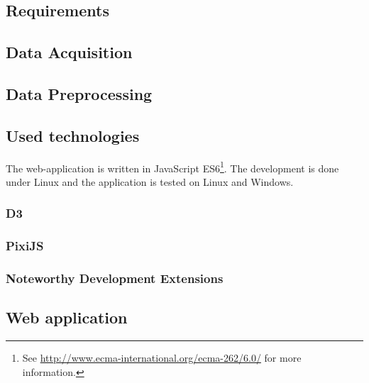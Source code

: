 \subsection{Requirements}


\subsection{Data Acquisition}
\label{s:data-acquisition}


\subsection{Data Preprocessing}
\label{s:data-preprocessing}


\subsection{Used technologies}
The web-application is written in JavaScript ES6\footnote{See \href{http://www.ecma-international.org/ecma-262/6.0/}{http://www.ecma-international.org/ecma-262/6.0/} for more information.}. The development is done under Linux and the application is tested on Linux and Windows.

\subsubsection{D3}


\subsubsection{PixiJS}


\subsubsection{Noteworthy Development Extensions}


\subsection{Web application}
\label{s:web-application}

